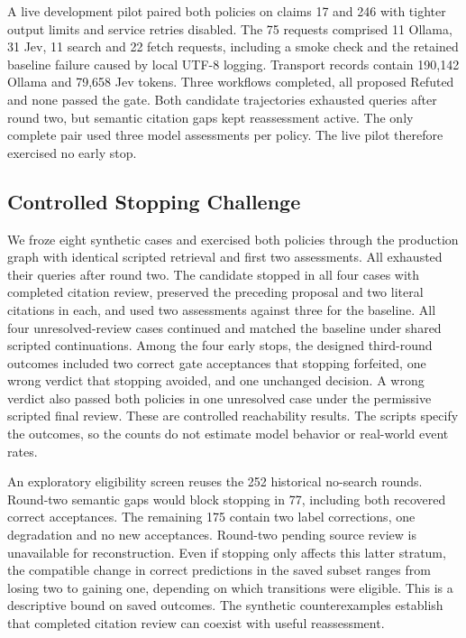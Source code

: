 \documentclass[conference]{IEEEtran}
\begin{document}
A live development pilot paired both policies on claims 17 and 246 with tighter output limits and service retries disabled. The 75 requests comprised 11 Ollama, 31 Jev, 11 search and 22 fetch requests, including a smoke check and the retained baseline failure caused by local UTF-8 logging. Transport records contain 190,142 Ollama and 79,658 Jev tokens. Three workflows completed, all proposed Refuted and none passed the gate. Both candidate trajectories exhausted queries after round two, but semantic citation gaps kept reassessment active. The only complete pair used three model assessments per policy. The live pilot therefore exercised no early stop.

\subsection{Controlled Stopping Challenge}
We froze eight synthetic cases and exercised both policies through the production graph with identical scripted retrieval and first two assessments. All exhausted their queries after round two. The candidate stopped in all four cases with completed citation review, preserved the preceding proposal and two literal citations in each, and used two assessments against three for the baseline. All four unresolved-review cases continued and matched the baseline under shared scripted continuations. Among the four early stops, the designed third-round outcomes included two correct gate acceptances that stopping forfeited, one wrong verdict that stopping avoided, and one unchanged decision. A wrong verdict also passed both policies in one unresolved case under the permissive scripted final review. These are controlled reachability results. The scripts specify the outcomes, so the counts do not estimate model behavior or real-world event rates.

An exploratory eligibility screen reuses the 252 historical no-search rounds. Round-two semantic gaps would block stopping in 77, including both recovered correct acceptances. The remaining 175 contain two label corrections, one degradation and no new acceptances. Round-two pending source review is unavailable for reconstruction. Even if stopping only affects this latter stratum, the compatible change in correct predictions in the saved subset ranges from losing two to gaining one, depending on which transitions were eligible. This is a descriptive bound on saved outcomes. The synthetic counterexamples establish that completed citation review can coexist with useful reassessment.
\end{document}
